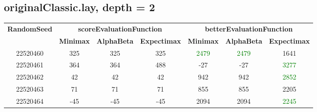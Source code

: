 \documentclass[english, a4paper,12pt]{article}
\begin{document}
\subsection*{originalClassic.lay, depth = 2}
\small\begin{tabular}{|c|c|c|c|c|c|c|}
\hline
\textbf{RandomSeed} & \multicolumn{3}{c|}{\textbf{scoreEvaluationFunction}} & \multicolumn{3}{c|}{\textbf{betterEvaluationFunction}} \\
\cline{2-7}
& \textbf{Minimax} & \textbf{AlphaBeta} & \textbf{Expectimax} & \textbf{Minimax} & \textbf{AlphaBeta} & \textbf{Expectimax} \\
\hline
22520460 & \textcolor{red!70}{325} & \textcolor{red!70}{325} & \textcolor{red!70}{325} & \textcolor{Green}{2479} & \textcolor{Green}{2479} & \textcolor{red!70}{1641} \\
22520461 & \textcolor{red!70}{364} & \textcolor{red!70}{364} & \textcolor{red!70}{488} & \textcolor{red!70}{-27} & \textcolor{red!70}{-27} & \textcolor{Green}{3277} \\
22520462 & \textcolor{red!70}{42} & \textcolor{red!70}{42} & \textcolor{red!70}{42} & \textcolor{red!70}{942} & \textcolor{red!70}{942} & \textcolor{Green}{2852} \\
22520463 & \textcolor{red!70}{71} & \textcolor{red!70}{71} & \textcolor{red!70}{71} & \textcolor{red!70}{855} & \textcolor{red!70}{855} & \textcolor{red!70}{2205} \\
22520464 & \textcolor{red!70}{-45} & \textcolor{red!70}{-45} & \textcolor{red!70}{-45} & \textcolor{red!70}{2094} & \textcolor{red!70}{2094} & \textcolor{Green}{2245} \\
\hline
\end{tabular}
\end{document}
